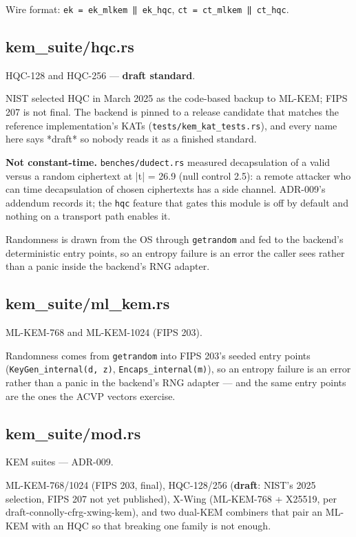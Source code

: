 \documentclass[11pt,a4paper]{article}
\begin{document}
Wire format: \texttt{ek = ek\_mlkem ‖ ek\_hqc}, \texttt{ct = ct\_mlkem ‖ ct\_hqc}.

\subsection{kem\_suite/hqc.rs}
HQC-128 and HQC-256 — \textbf{draft standard}.

NIST selected HQC in March 2025 as the code-based backup to ML-KEM; FIPS
207 is not final. The backend is pinned to a release candidate that
matches the reference implementation's KATs (\texttt{tests/kem\_kat\_tests.rs}),
and every name here says *draft* so nobody reads it as a finished standard.

\textbf{Not constant-time.} \texttt{benches/dudect.rs} measured decapsulation of a
valid versus a random ciphertext at |t| = 26.9 (null control 2.5): a
remote attacker who can time decapsulation of chosen ciphertexts has a
side channel. ADR-009's addendum records it; the \texttt{hqc} feature that gates
this module is off by default and nothing on a transport path enables it.

Randomness is drawn from the OS through \texttt{getrandom} and fed to the
backend's deterministic entry points, so an entropy failure is an error
the caller sees rather than a panic inside the backend's RNG adapter.

\subsection{kem\_suite/ml\_kem.rs}
ML-KEM-768 and ML-KEM-1024 (FIPS 203).

Randomness comes from \texttt{getrandom} into FIPS 203's seeded entry points
(\texttt{KeyGen\_internal(d, z)}, \texttt{Encaps\_internal(m)}), so an entropy failure is
an error rather than a panic in the backend's RNG adapter — and the same
entry points are the ones the ACVP vectors exercise.

\subsection{kem\_suite/mod.rs}
KEM suites — ADR-009.

ML-KEM-768/1024 (FIPS 203, final), HQC-128/256 (\textbf{draft}: NIST's 2025
selection, FIPS 207 not yet published), X-Wing (ML-KEM-768 + X25519, per
draft-connolly-cfrg-xwing-kem), and two dual-KEM combiners that pair an
ML-KEM with an HQC so that breaking one family is not enough.
\end{document}
